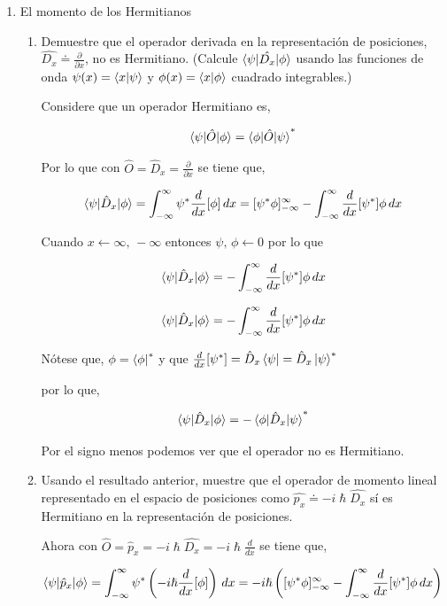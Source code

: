 \documentclass[12pt,a4paper]{article}
\begin{document}
\begin{enumerate}
\item El momento de los Hermitianos

\begin{enumerate}
\item Demuestre que el operador derivada en la representación de posiciones, $ \hat{D_{x}} \doteq \frac{\partial }{\partial x}  $, no es Hermitiano. (Calcule $ \braket{\psi|\hat{D_{x}}|\phi} $ usando las funciones de onda $ \psi(x) = \braket{x|\psi} $ y $\phi(x) =  \braket{x|\phi} $ cuadrado integrables.) 

Considere que un operador Hermitiano es, 

\[
\braket{\psi|\hat{O}|\phi} = \braket{\phi|\hat{O}|\psi}^{*}
\]

Por lo que con $ \hat{O} = \hat{D}_{x} = \frac{\partial }{\partial x} $ se tiene que, 


\[
\braket{\psi|\hat{D}_{x}|\phi} = \int_{-\infty}^{\infty} \psi^{*}\frac{d}{dx}[\phi] \, dx = [\psi^{*}\phi]_{-\infty}^{\infty} - \int_{-\infty}^{\infty} \frac{d}{dx}[\psi^{*}] \phi \, dx
\]

Cuando $ x \leftarrow \infty, \, -\infty $ entonces $ \psi, \, \phi \leftarrow 0 $ por lo que 

\[
\braket{\psi|\hat{D}_{x}|\phi} = - \int_{-\infty}^{\infty} \frac{d}{dx}[\psi^{*}] \phi \, dx
\]

\[
\braket{\psi|\hat{D}_{x}|\phi} = - \int_{-\infty}^{\infty} \frac{d}{dx}[\psi^{*}] \phi \, dx
\]

Nótese que, $ \phi = \bra{\phi}^{*}$ y que $ \frac{d}{dx}[\psi^{*}] = \hat{D}_x \bra{\psi} =  \hat{D}_x \ket{\psi}^{*}$

por lo que,

\[
\braket{\psi|\hat{D}_{x}|\phi} = - \braket{\phi|\hat{D}_{x}|\psi}^{*} 
\]

Por el signo menos podemos ver que el operador no es Hermitiano.


\item Usando el resultado anterior, muestre que el operador de momento lineal representado en el espacio de posiciones como $ \hat{p_{x}} \doteq -i\hslash\hat{D_{x}} $ sí es Hermitiano en la representación de posiciones.

Ahora con $ \hat{O} = \hat{p}_{x} = -i\hslash\hat{D_{x}} = -i\hslash \frac{d}{dx} $ se tiene que, 

\[
\braket{\psi|\hat{p}_{x}|\phi} = \int_{-\infty}^{\infty} \psi^{*}\left( -i\hslash\frac{d}{dx}[\phi] \right) \, dx = -i\hslash\left(  [\psi^{*}\phi]_{-\infty}^{\infty} - \int_{-\infty}^{\infty} \frac{d}{dx}[\psi^{*}] \phi \, dx\right)
\]


\end{enumerate}
\end{enumerate}
\end{document}
